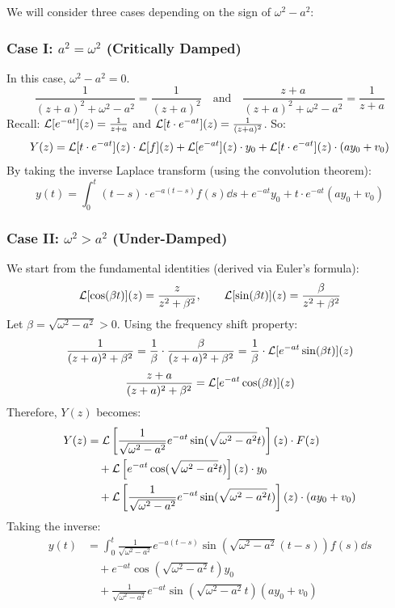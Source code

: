 We will consider three cases depending on the sign of $\omega^2 - a^2$:

\subsubsection{Case I: $a^2 = \omega^2$ (Critically Damped)}
In this case, $\omega^2 - a^2 = 0$.
\[
\frac{1}{(z+a)^2 + \omega^2 - a^2} = \frac{1}{(z+a)^2} \quad \text{and} \quad \frac{z+a}{(z+a)^2 + \omega^2 - a^2} = \frac{1}{z+a}
\]
Recall: $\mathcal{L}[e^{-at}](z) = \frac{1}{z+a}$ and $\mathcal{L}[t \cdot e^{-at}](z) = \frac{1}{(z+a)^2}$. So:
\[
Y(z) = \mathcal{L}[t \cdot e^{-at}](z) \cdot \mathcal{L}[f](z) + \mathcal{L}[e^{-at}](z) \cdot y_0 + \mathcal{L}[t \cdot e^{-at}](z) \cdot (ay_0 + v_0)
\]
By taking the inverse Laplace transform (using the convolution theorem):
\[
y(t) = \int_{0}^{t} (t-s) \cdot e^{-a(t-s)}f(s)\dd s + e^{-at}y_0 + t \cdot e^{-at}(ay_0 + v_0)
\]
\begin{center}
\end{center}

\subsubsection{Case II: $\omega^2 > a^2$ (Under-Damped)}

We start from the fundamental identities (derived via Euler's formula):
\[
\mathcal{L}[\cos(\beta t)](z) = \frac{z}{z^2 + \beta^2}, \qquad \mathcal{L}[\sin(\beta t)](z) = \frac{\beta}{z^2 + \beta^2}
\]
Let $\beta = \sqrt{\omega^2 - a^2} > 0$. Using the frequency shift property:
\[
\frac{1}{(z+a)^2 + \beta^2} = \frac{1}{\beta} \cdot \frac{\beta}{(z+a)^2 + \beta^2} = \frac{1}{\beta} \cdot \mathcal{L}[e^{-at} \sin(\beta t)](z)
\]
\[
\frac{z+a}{(z+a)^2 + \beta^2} = \mathcal{L}[e^{-at} \cos(\beta t)](z)
\]
Therefore, $Y(z)$ becomes:
\begin{align*}
Y(z) &= \mathcal{L}\left[\frac{1}{\sqrt{\omega^2 - a^2}}e^{-at}\sin(\sqrt{\omega^2 - a^2}t)\right](z) \cdot F(z) \\
&\quad + \mathcal{L}\left[e^{-at}\cos(\sqrt{\omega^2 - a^2}t)\right](z) \cdot y_0 \\
&\quad + \mathcal{L}\left[\frac{1}{\sqrt{\omega^2 - a^2}}e^{-at}\sin(\sqrt{\omega^2 - a^2}t)\right](z) \cdot (ay_0 + v_0)
\end{align*}
Taking the inverse:
\begin{align*}
y(t) &= \int_{0}^{t} \frac{1}{\sqrt{\omega^2-a^2}} e^{-a(t-s)} \sin\left(\sqrt{\omega^2-a^2}(t-s)\right)f(s)\dd s \\
&\quad + e^{-at}\cos\left(\sqrt{\omega^2-a^2}t\right)y_0 \\
&\quad + \frac{1}{\sqrt{\omega^2-a^2}}e^{-at}\sin\left(\sqrt{\omega^2-a^2}t\right)(ay_0 + v_0)
\end{align*}

